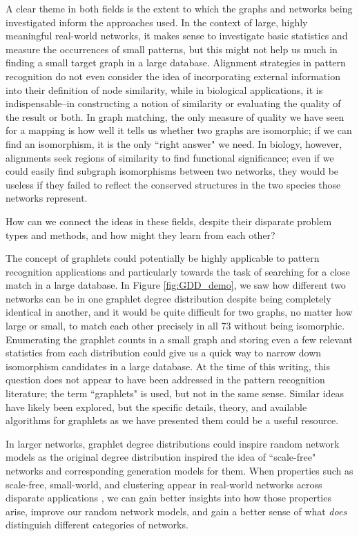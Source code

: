 \documentclass[12pt]{thesis}
\theoremstyle{plain}
\theoremstyle{definition}
\theoremstyle{remark}
\begin{document}
A clear theme in both fields is the extent to which the graphs and networks being investigated inform the approaches used. In the context of large, highly meaningful real-world networks, it makes sense to investigate basic statistics and measure the occurrences of small patterns, but this might not help us much in finding a small target graph in a large database. Alignment strategies in pattern recognition do not even consider the idea of incorporating external information into their definition of node similarity, while in biological applications, it is indispensable--in constructing a notion of similarity or evaluating the quality of the result or both. In graph matching, the only measure of quality we have seen for a mapping is how well it tells us whether two graphs are isomorphic; if we can find an isomorphism, it is the only ``right answer" we need. In biology, however, alignments seek regions of similarity to find functional significance; even if we could easily find subgraph isomorphisms between two networks, they would be useless if they failed to reflect the conserved structures in the two species those networks represent.

How can we connect the ideas in these fields, despite their disparate problem types and methods, and how might they learn from each other? 

The concept of graphlets could potentially be highly applicable to pattern recognition applications and particularly towards the task of searching for a close match in a large database. In Figure \ref{fig:GDD_demo}, we saw how different two networks can be in one graphlet degree distribution despite being completely identical in another, and it would be quite difficult for two graphs, no matter how large or small, to match each other precisely in all 73 without being isomorphic. Enumerating the graphlet counts in a small graph and storing even a few relevant statistics from each distribution could give us a quick way to narrow down isomorphism candidates in a large database. At the time of this writing, this question does not appear to have been addressed in the pattern recognition literature; the term ``graphlets" is used, but not in the same sense. Similar ideas have likely been explored, but the specific details, theory, and available algorithms for graphlets as we have presented them could be a useful resource.

In larger networks, graphlet degree distributions could inspire random network models as the original degree distribution inspired the idea of ``scale-free" networks and corresponding generation models for them. When properties such as scale-free, small-world, and clustering appear in real-world networks across disparate applications \cite{jackson2005economics}, we can gain better insights into how those properties arise, improve our random network models, and gain a better sense of what \textit{does} distinguish different categories of networks.
\end{document}
